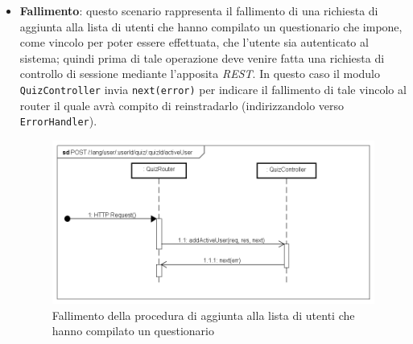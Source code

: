 \begin{itemize}
\item \textbf{Fallimento}: questo scenario rappresenta il fallimento di una richiesta di aggiunta alla lista di utenti che hanno compilato un questionario che impone, come vincolo per poter essere effettuata, che l'utente sia autenticato al sistema; quindi prima di tale operazione deve venire fatta una richiesta di controllo di sessione mediante l'apposita \textit{REST}. In questo caso il modulo \texttt{QuizController} invia \texttt{next(error)} per indicare il fallimento di tale vincolo al router il quale avrà compito di reinstradarlo (indirizzandolo verso \texttt{ErrorHandler}).
\label{Fallimento della procedura di aggiunta alla lista di utenti che hanno compilato un questionario}
\begin{figure}[ht]
	\centering
	\includegraphics[scale=0.40]{UML/DiagrammiDiSequenza/Back-end/POST__lang_user_userId_quiz_quizId_activeUser_failure.png}
	\caption{Fallimento della procedura di aggiunta alla lista di utenti che hanno compilato un questionario}
\end{figure}
\FloatBarrier
\end{itemize}

